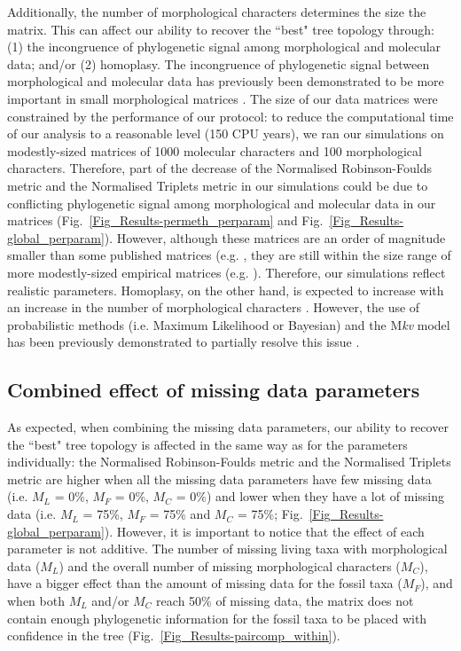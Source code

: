 \documentclass[10pt,letterpaper]{article}
\begin{document}
Additionally, the number of morphological characters determines the size the matrix. This can affect our ability to recover the ``best" tree topology through: (1) the incongruence of phylogenetic signal among morphological and molecular data; and/or (2) homoplasy. The incongruence of phylogenetic signal between morphological and molecular data has previously been demonstrated to be more important in small morphological matrices \cite{wagner2000}. The size of our data matrices were constrained by the performance of our protocol: to reduce the computational time of our analysis to a reasonable level (150 CPU years), we ran our simulations on modestly-sized matrices of 1000 molecular characters and 100 morphological characters. Therefore, part of the decrease of the Normalised Robinson-Foulds metric and the Normalised Triplets metric in our simulations could be due to conflicting phylogenetic signal among morphological and molecular data in our matrices (Fig.~\ref{Fig_Results-permeth_perparam} and Fig.~\ref{Fig_Results-global_perparam}). However, although these matrices are an order of magnitude smaller than some published matrices (e.g. \cite{springermacroevolutionary2012,nithe2013}, they are still within the size range of more modestly-sized empirical matrices (e.g. \cite{kellymolecular2014, sallam2011craniodental}). Therefore, our simulations reflect realistic parameters. Homoplasy, on the other hand, is expected to increase with an increase in the number of morphological characters \cite{wrightbayesian2014}. However, the use of probabilistic methods (i.e. Maximum Likelihood or Bayesian) and the M\textit{kv} model \cite{lewisa2001} has been previously demonstrated to partially resolve this issue \cite{wrightbayesian2014}.

\subsection*{Combined effect of missing data parameters}
As expected, when combining the missing data parameters, our ability to recover the ``best" tree topology is affected in the same way as for the parameters individually: the Normalised Robinson-Foulds metric and the Normalised Triplets metric are higher when all the missing data parameters have few missing data (i.e. $M_{L}$ = 0\%, $M_{F}$ = 0\%, $M_{C}$ = 0\%) and lower when they have a lot of missing data (i.e. $M_{L}$ = 75\%, $M_{F}$ = 75\% and $M_{C}$ = 75\%; Fig.~\ref{Fig_Results-global_perparam}). However, it is important to notice that the effect of each parameter is not additive. The number of missing living taxa with morphological data ($M_{L}$) and the overall number of missing morphological characters ($M_{C}$), have a bigger effect than the amount of missing data for the fossil taxa ($M_{F}$), and when both $M_{L}$ and/or $M_{C}$ reach 50\% of missing data, the matrix does not contain enough phylogenetic information for the fossil taxa to be placed with confidence in the tree (Fig.~\ref{Fig_Results-paircomp_within}).
\end{document}
